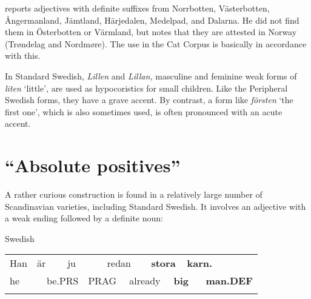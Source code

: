 \begin{styleBodytextC}
\citet[51]{Delsing2003a} reports adjectives with definite suffixes from Norrbotten, Västerbotten, Ångermanland, Jämtland, Härjedalen, Medelpad, and Dalarna. He did not find them in Österbotten or Värmland, but notes that they are attested in Norway (Trøndelag and Nordmøre). The use in the Cat Corpus is basically in accordance with this. 

\end{styleBodytextC}

\begin{styleBodytextC}
In Standard Swedish, \textit{Lillen} and \textit{Lillan,} masculine and feminine weak forms of \textit{liten} ‘little’, are used as hypocoristics for small children. Like the Peripheral Swedish forms, they have a grave accent. By contrast, a form like \textit{försten} ‘the first one’, which is also sometimes used, is often pronounced with an acute accent. 

\end{styleBodytextC}

\section{“Absolute positives”}
\label{bkm:Ref141250984}
\begin{styleBodyTextFirst}
A rather curious construction is found in a relatively large number of Scandinavian varieties, including Standard Swedish. It involves an adjective with a weak ending followed by a definite noun:

\end{styleBodyTextFirst}

\begin{listWWNumileveli}
\item {}

\begin{styleExample}
Swedish

\end{styleExample}

\end{listWWNumileveli}

\begin{tabular}{llllllllllll}
\lsptoprule
Han & \multicolumn{2}{l}{är

} & \multicolumn{2}{l}{ju

} & \multicolumn{2}{l}{redan

} & \multicolumn{2}{l}{{\bfseries stora}

} & \multicolumn{2}{l}{{\bfseries karn.}

} & \\
\multicolumn{2}{l}{he

} & \multicolumn{2}{l}{be.PRS

} & \multicolumn{2}{l}{PRAG

} & \multicolumn{2}{l}{already

} & \multicolumn{2}{l}{{\bfseries big}

} & \multicolumn{2}{l}{{\bfseries man.DEF}

}\\
\lspbottomrule
\end{tabular}

